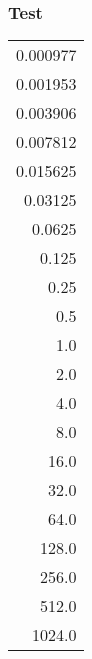 \documentclass[11pt]{article}
\begin{document}
\subsubsection*{Test}
\label{sec-1-5-6}
\begin{center}
\begin{tabular}{r}
0.000977\\
0.001953\\
0.003906\\
0.007812\\
0.015625\\
0.03125\\
0.0625\\
0.125\\
0.25\\
0.5\\
1.0\\
2.0\\
4.0\\
8.0\\
16.0\\
32.0\\
64.0\\
128.0\\
256.0\\
512.0\\
1024.0\\
\end{tabular}
\end{center}
\end{document}
